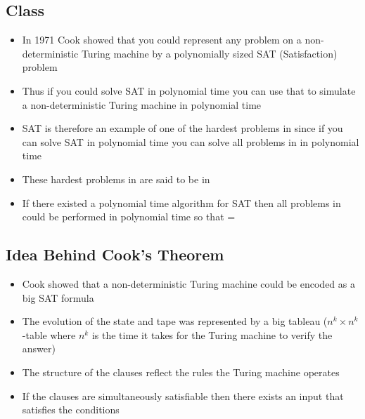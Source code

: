 
\begin{slide}
\section[-2]{Class }

\begin{PauseHighLight}
  \begin{itemize}\squeeze
  \item In 1971 Cook showed that you could represent any 
    problem on a non-deterministic Turing machine by a polynomially
    sized SAT (Satisfaction) problem\pause
  \item Thus if you could solve SAT in polynomial time you can use
    that to simulate a non-deterministic Turing machine in polynomial
    time\pause
  \item SAT is therefore an example of one of the hardest
    problems in  since if you can solve SAT in
    polynomial time you can solve all problems in  in
    polynomial time\pause
  \item These hardest problems in  are said to be in
    \pause
  \item If there existed a polynomial time algorithm for SAT then all
    problems in  could be performed in polynomial time so that
    =\pause
  \end{itemize}
\end{PauseHighLight}

\end{slide}



\begin{slide}
\section{Idea Behind Cook's Theorem}

\begin{PauseHighLight}
  \begin{itemize}
  \item Cook showed that a non-deterministic Turing machine could be
    encoded as a big SAT formula\pause
  \item The evolution of the state and tape was represented by a big
    tableau ($n^k\times n^k$-table where $n^k$ is the time it takes for
    the Turing machine to verify the answer)\pause
  \item The structure of the clauses reflect the rules the
    Turing machine operates\pause
  \item If the clauses are simultaneously satisfiable then there exists
    an input that satisfies the conditions\pause
  \end{itemize}
\end{PauseHighLight}

\end{slide}


